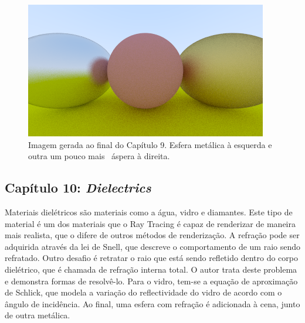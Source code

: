 \documentclass[journal]{IEEEtran}
\begin{document}
\begin{figure}[ht]
  \centering
  \includegraphics[width=\linewidth]{media/img-1.12-metal-fuzz.png}
  \caption{Imagem gerada ao final do Capítulo 9. Esfera metálica à esquerda e outra um pouco mais \
  áspera à direita.}
  \label{img_metal}
\end{figure}


\subsection*{Capítulo 10: \emph{Dielectrics}}
Materiais dielétricos são materiais como a água, vidro e diamantes. Este tipo de material é um dos materiais
que o Ray Tracing é capaz de renderizar de maneira mais realista, que o difere de outros métodos de renderização.
A refração pode ser adquirida através da lei de Snell, que descreve o comportamento de um raio sendo refratado.
Outro desafio é retratar o raio que está sendo refletido dentro do corpo dielétrico, que é chamada de refração
interna total. O autor trata deste problema e demonstra formas de resolvê-lo. Para o vidro, tem-se a equação
de aproximação de Schlick, que modela a variação do reflectividade do vidro de acordo com o ângulo de incidência.
Ao final, uma esfera com refração é adicionada à cena, junto de outra metálica.
\end{document}
